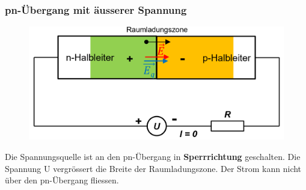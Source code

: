 \begin{minipage}{\linewidth}
        \subsubsection{pn-Übergang mit äusserer Spannung}
    \begin{figure}
       \vspace{-1cm}
        \includegraphics[width=\linewidth]{images/pnuebergengmitu}
    \end{figure}
    Die Spannungsquelle ist an den pn-Übergang in \textbf{Sperrrichtung} geschalten.\newline
    Die Spannung U vergrössert die Breite der Raumladungszone. Der Strom kann nicht über den pn-Übergang fliessen.
\end{minipage}
\clearpage
